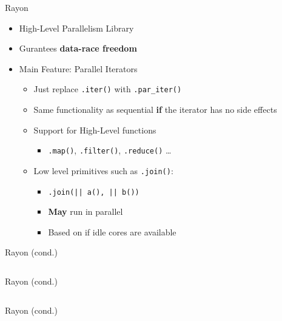 \documentclass[compress,aspectratio=169]{beamer}
\begin{document}
\begin{frame}{Rayon \cite{rayon}}
  \begin{itemize}
    \item High-Level Parallelism Library
    \item Gurantees \textbf{data-race freedom}
    \item Main Feature: Parallel Iterators
      \begin{itemize}
        \item Just replace \texttt{.iter()} with \texttt{.par\_iter()}
        \item Same functionality as sequential \textbf{if} the iterator has no side effects
        \item Support for High-Level functions
          \begin{itemize}
            \item \texttt{.map()}, \texttt{.filter()}, \texttt{.reduce()} \dots
          \end{itemize}
        \item Low level primitives such as \texttt{.join()}:
          \begin{itemize}
            \item \texttt{.join(|| a(), || b())}
            \item \textbf{May} run in parallel
            \item Based on if idle cores are available
          \end{itemize}
      \end{itemize}
  \end{itemize}
\end{frame}

\begin{frame}{Rayon (cond.)}
  \begin{tcolorbox}[title=Unported Code (no transpose)]
    \footnotesize\inputminted[xleftmargin=1em,linenos]{rust}{../assets/01rayon.rs}
  \end{tcolorbox}
\end{frame}

\begin{frame}{Rayon (cond.)}
  \begin{tcolorbox}[title=Ported to Iterators]
    \footnotesize\inputminted[xleftmargin=1em,linenos]{rust}{../assets/02rayon.rs}
  \end{tcolorbox}
\end{frame}

\begin{frame}{Rayon (cond.)}
  \begin{tcolorbox}[title=Ported to Iterators \textbf{and Parallelized!}]
    \footnotesize\inputminted[xleftmargin=1em,linenos]{rust}{../assets/03rayon.rs}
  \end{tcolorbox}
\end{frame}
\end{document}
